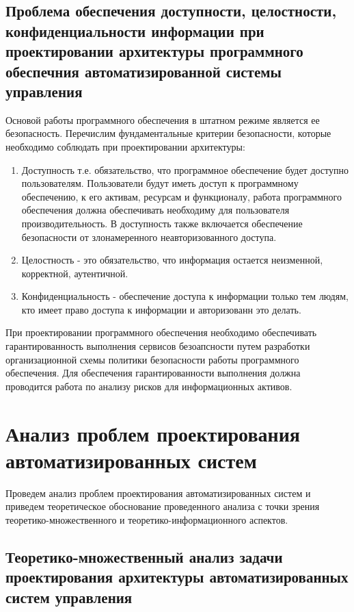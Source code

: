 \subsection{Проблема обеспечения доступности, целостности, конфиденциальности информации при проектировании архитектуры программного обеспечния автоматизированной системы управления}\label{sec:ch1/sec4/sub5}

Основой работы программного обеспечения в штатном режиме является ее безопасность. Перечислим фундаментальные критерии безопасности, которые необходимо соблюдать при проектировании архитектуры:
\begin{enumerate}
    \item   Доступность т.е. обязательство, что программное обеспечение будет доступно пользователям. Пользователи будут иметь доступ к программному обеспечению, к его активам, ресурсам и функционалу, работа программного обеспечения должна обеспечивать необходиму для пользователя производительность. В доступность также включается обеспечение безопасности от злонамеренного неавторизованного доступа.
    \item  Целостность - это обязательство, что информация остается неизменной, корректной, аутентичной.
    \item  Конфиденциальность - обеспечение доступа к информации только тем людям, кто имеет право доступа к информации и авторизованн это делать.
\end{enumerate}

При проектировании программного обеспечения необходимо обеспечивать гарантированность выполнения сервисов безоапсности путем разработки организационной схемы политики безопасности работы программного обеспечения. Для обеспечения гарантированности выполнения должна проводится работа по анализу рисков для информационных активов\cite{Ref1}.

\section{Анализ проблем проектирования автоматизированных систем}\label{sec:ch1/sec5}

Проведем анализ проблем проектирования автоматизированных систем и приведем теоретическое обоснование проведенного анализа с точки зрения теоретико-множественного и теоретико-информационного аспектов.

\subsection{Теоретико-множественный анализ задачи проектирования архитектуры автоматизированных систем управления}\label{sec:ch1/sec5/sub1}

